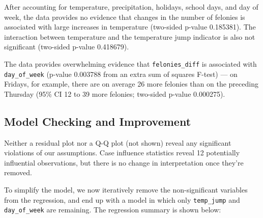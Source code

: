 \documentclass[11pt,notitlepage]{article}
\newenvironment{codeSmall}%
   {\par\noindent\adjustbox{margin=1ex,bgcolor=shadecolor,margin=0ex \medskipamount}\bgroup\minipage\linewidth\verbatim\footnotesize}%
   {\endverbatim\endminipage\egroup}
\begin{document}



After accounting for temperature, precipitation, holidays, school days, and day of week, the data provides no evidence that changes in the number of felonies is associated with large increases in temperature (two-sided p-value 0.185381). The interaction between temperature and the temperature jump indicator is also not significant (two-sided p-value 0.418679).

The data provides overwhelming evidence that \texttt{felonies_diff} is associated with \texttt{day_of_week} (p-value 0.003788 from an extra sum of squares F-test) --- on Fridays, for example, there are on average 26 more felonies than on the preceding Thursday (95\% CI 12 to 39 more felonies; two-sided p-value 0.000275).


\subsection{Model Checking and Improvement}
\label{sec:modelFeloniesDiffModelCheckingImprovement}


Neither a residual plot nor a Q-Q plot (not shown) reveal any significant violations of our assumptions. Case influence statistics reveal 12 potentially influential observations, but there is no change in interpretation once they're removed.

To simplify the model, we now iteratively remove the non-significant variables from the regression, and end up with a model in which only \texttt{temp_jump} and \texttt{day_of_week} are remaining. The regression summary is shown below:

\end{document}
